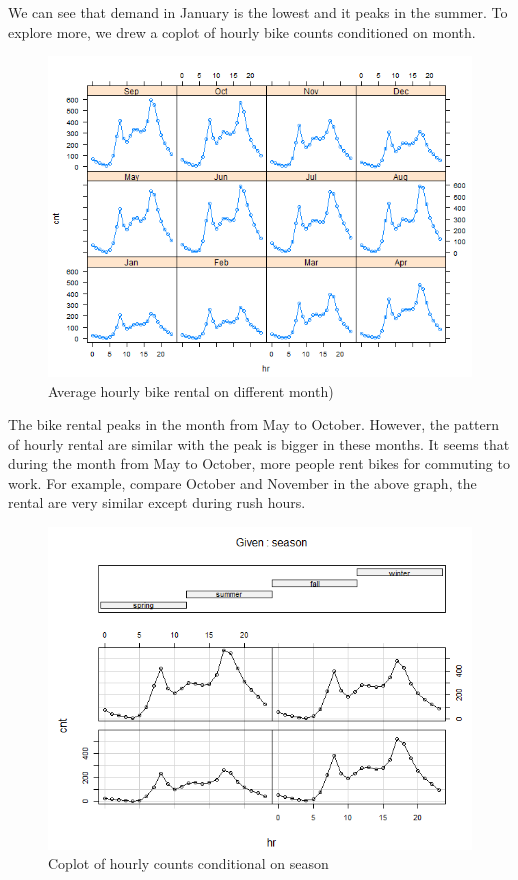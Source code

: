 \documentclass[12pt]{article}
\begin{document}
	We can see that demand in January is the lowest and it peaks in the summer. To explore more, we drew a coplot of hourly bike counts conditioned on month.
	
	\begin{figure}[H]
		\centering
		\includegraphics[scale=1]{figures/cnt_hr_mnth.png}
		\caption{Average hourly bike rental on different month)}
	\end{figure}
	The bike rental peaks in the month from May to October. However, the pattern of hourly rental are similar with the peak is bigger in these months. It seems that during the month from May to October, more people rent bikes for commuting to work. For example, compare October and November in the above graph, the rental are very similar except during rush hours. 
	
		\begin{figure}[H]
			\centering
			\includegraphics[scale=.9]{figures/coplot_season.png}
			\caption{Coplot of hourly counts conditional on season}
		\end{figure}
	
\end{document}
